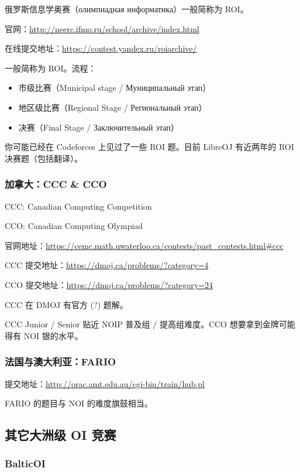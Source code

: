 俄罗斯信息学奥赛（олимпиадная информатика）一般简称为 ROI。  

官网：\url{http://neerc.ifmo.ru/school/archive/index.html}  

在线提交地址：\url{https://contest.yandex.ru/roiarchive/}  

一般简称为 ROI。流程：

\begin{itemize}
\item 市级比赛（Municipal stage / Муниципальный этап）
\item 地区级比赛（Regional Stage / Региональный этап）
\item 决赛（Final Stage / Заключительный этап）
\end{itemize}

你可能已经在 Codeforces 上见过了一些 ROI 题。目前 LibreOJ 有近两年的 ROI 决赛题（包括翻译）。

\subsubsection{加拿大：CCC \& CCO}

CCC: Canadian Computing Competition  

CCO: Canadian Computing Olympiad  

官网地址：\url{https://cemc.math.uwaterloo.ca/contests/past_contests.html#ccc}  

CCC 提交地址：\url{https://dmoj.ca/problems/?category=4}  

CCO 提交地址：\url{https://dmoj.ca/problems/?category=24}  

CCC 在 DMOJ 有官方 (?) 题解。  

CCC Junior / Senior 贴近 NOIP 普及组 / 提高组难度。CCO 想要拿到金牌可能得有 NOI 银的水平。

\subsubsection{法国与澳大利亚：FARIO}

提交地址：\url{http://orac.amt.edu.au/cgi-bin/train/hub.pl}

FARIO 的题目与 NOI 的难度旗鼓相当。

\subsection{其它大洲级 OI 竞赛}

\subsubsection{BalticOI}

